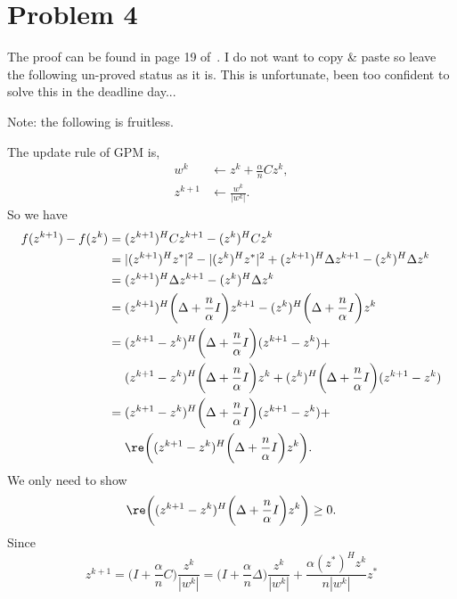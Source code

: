 \clearpage
\section{Problem 4}

The proof can be found in page 19 of~\cite{liu2016estimation}.
I do not want to copy \& paste so leave the following un-proved status as it is.
This is unfortunate,
been too confident to solve this in the deadline day...

Note: the following is fruitless.

The update rule of GPM is,
\begin{equation}
\begin{split}
    w^k &\leftarrow z^k+\frac{\alpha}{n}Cz^k, \\
    z^{k+1} &\leftarrow \frac{w^k}{|w^k|}.
\end{split}
\end{equation}
So we have
\begin{equation}
\begin{split}
    f(z^{k+1})-f(z^k)
    &= (z^{k+1})^HCz^{k+1} - (z^k)^HCz^k \\
    &= |(z^{k+1})^Hz^*|^2 - |(z^k)^Hz^*|^2 +
        (z^{k+1})^H\Delta z^{k+1} - (z^k)^H\Delta z^k \\
    &= (z^{k+1})^H\Delta z^{k+1} - (z^k)^H\Delta z^k \\
    &= (z^{k+1})^H\bigg(\Delta+\frac{n}{\alpha}I\bigg) z^{k+1} -
        (z^k)^H\bigg(\Delta+\frac{n}{\alpha}I\bigg) z^k \\
    &= (z^{k+1}-z^k)^H\bigg(\Delta+\frac{n}{\alpha}I\bigg) (z^{k+1}-z^k) +\\
        &\quad~ (z^{k+1}-z^k)^H\bigg(\Delta+\frac{n}{\alpha}I\bigg) z^k + (z^k)^H\bigg(\Delta+\frac{n}{\alpha}I\bigg) (z^{k+1}-z^k) \\
    &= (z^{k+1}-z^k)^H\bigg(\Delta+\frac{n}{\alpha}I\bigg) (z^{k+1}-z^k) +\\
        &\quad~ \re\bigg((z^{k+1}-z^k)^H\bigg(\Delta+\frac{n}{\alpha}I\bigg) z^k\bigg). \\
\end{split}
\end{equation}
We only need to show
\begin{equation}
    \re\bigg((z^{k+1}-z^k)^H\bigg(\Delta+\frac{n}{\alpha}I\bigg) z^k\bigg) \ge 0.
\end{equation}
Since
\begin{equation}
    z^{k+1} = \bigg(I+\frac{\alpha}{n}C\bigg)\frac{z^k}{|w^k|}
        =\bigg(I+\frac{\alpha}{n}\Delta\bigg)\frac{z^k}{|w^k|}+
            \frac{\alpha(z^*)^Hz^k}{n|w^k|}z^*
\end{equation}
